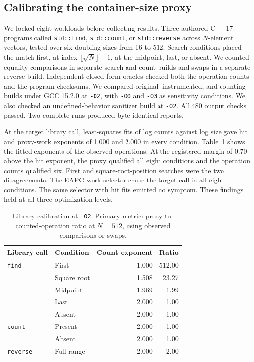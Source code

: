 \subsection{Calibrating the container-size proxy}
\label{sec:find-proxy}

We locked eight workloads before collecting results. Three authored C++17 programs called \texttt{std::find}, \texttt{std::count}, or \texttt{std::reverse} across $N$-element vectors, tested over six doubling sizes from 16 to 512. Search conditions placed the match first, at index $\lfloor\sqrt{N}\rfloor-1$, at the midpoint, last, or absent. We counted equality comparisons in separate search and count builds and swaps in a separate reverse build. Independent closed-form oracles checked both the operation counts and the program checksums. We compared original, instrumented, and counting builds under GCC 15.2.0 at \texttt{-O2}, with \texttt{-O0} and \texttt{-O3} as sensitivity conditions. We also checked an undefined-behavior sanitizer build at \texttt{-O2}. All 480 output checks passed. Two complete runs produced byte-identical reports.

At the target library call, least-squares fits of log counts against log size gave hit and proxy-work exponents of 1.000 and 2.000 in every condition. Table~\ref{tab:library-calibration} shows the fitted exponents of the observed operations. At the registered margin of 0.70 above the hit exponent, the proxy qualified all eight conditions and the operation counts qualified six. First and square-root-position searches were the two disagreements. The EAPG work selector chose the target call in all eight conditions. The same selector with hit fits emitted no symptom. These findings held at all three optimization levels.

\begin{table}[t]
\centering
\caption{Library calibration at \texttt{-O2}. Primary metric: proxy-to-counted-operation ratio at $N=512$, using observed comparisons or swaps.}
\label{tab:library-calibration}
\begin{tabular}{llrr}
\toprule
Library call & Condition & Count exponent & Ratio \\
\midrule
\texttt{find} & First & 1.000 & 512.00 \\
 & Square root & 1.508 & 23.27 \\
 & Midpoint & 1.969 & 1.99 \\
 & Last & 2.000 & 1.00 \\
 & Absent & 2.000 & 1.00 \\
\texttt{count} & Present & 2.000 & 1.00 \\
 & Absent & 2.000 & 1.00 \\
\texttt{reverse} & Full range & 2.000 & 2.00 \\
\bottomrule
\end{tabular}
\end{table}

